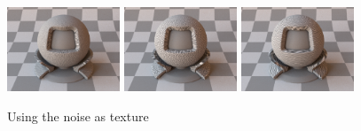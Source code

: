 \documentclass[journal, a4paper]{IEEEtran}
\begin{document}
  \begin{figure}[!hbt]
    \centering
    \includegraphics[width=0.3\textwidth]{ren1.png}
    \includegraphics[width=0.3\textwidth]{ren2.png}
    \includegraphics[width=0.3\textwidth]{ren3.png}
    \caption{Using the noise as texture}
  \end{figure}

  

  


\end{document}

